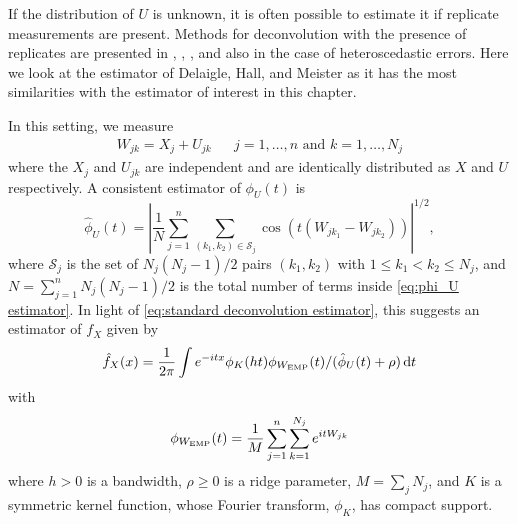 	If the distribution of $U$ is unknown, it is often possible to estimate it if replicate measurements are present. Methods for deconvolution with the presence of replicates are presented in \cite{Li1998-mj}, \cite{Lin2006-mm}, \cite{Delaigle2008-hl}, and also \cite{McIntyre2011-fg} in the case of heteroscedastic errors. Here we look at the estimator of Delaigle, Hall, and Meister \cite{Delaigle2008-hl} as it has the most similarities with the estimator of interest in this chapter.

	In this setting, we measure
	\begin{align}
		W_{jk} = X_j + U_{jk} && j = 1, \dots, n \text{ and } k = 1, \dots, N_j
	\end{align}
	where the $X_j$ and $U_{jk}$ are independent and are identically distributed as $X$ and $U$ respectively. A consistent estimator of $\phi_U(t)$ is
	\begin{equation}
		\hat{\phi}_U(t) = \left|\frac{1}{N} \sum_{j = 1}^n \sum_{(k_1, k_2) \in \mathscr{S}_j} \cos \left(t (W_{jk_1} - W_{jk_2})\right)\right|^{1/2},
		\label{eq:phi_U estimator}
	\end{equation}
	where $\mathscr{S}_j$ is the set of $N_j(N_j - 1)/2$ pairs $(k_1, k_2)$ with $1 \leq k_1 < k_2 \leq N_j$, and $N = \sum_{j=1}^n N_j(N_j - 1)/2$ is the total number of terms inside \eqref{eq:phi_U estimator}.
	In light of \eqref{eq:standard deconvolution estimator}, this suggests an estimator of $f_X$ given by 
	\begin{equation}
	\label{eq:replicates estimator}
		\hat{f}_X(x) = \frac{1}{2\pi} \int e^{-itx} \phi_K(ht) \phi_{W_\mathrm{EMP}}(t)  / (\hat{\phi}_U(t) + \rho )\, \mathrm{d} t
	\end{equation}
	with
	\begin{equation}
		\phi_{W_\mathrm{EMP}}(t) = \frac{1}{M} \sum_{j = 1}^n \sum_{k= 1}^{N_j} e^{i t W_{jk}}
	\end{equation}
	where
	$h > 0$ is a bandwidth, $\rho \geq 0$ is a ridge parameter, $M = \sum_j N_j$, and $K$ is a symmetric kernel function, whose Fourier transform, $\phi_K$, has compact support.

